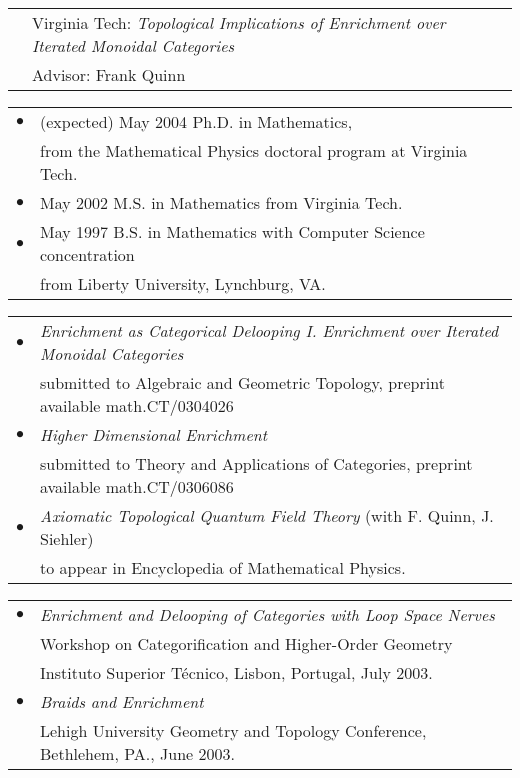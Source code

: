\documentclass[10pt]{article}
\begin{document}

\begin{tabular}{ll}
&Virginia Tech: {\itshape Topological Implications of Enrichment over Iterated Monoidal Categories}\\
&Advisor: Frank Quinn
\end{tabular}
\newline


\begin{tabular}{ll}
$\bullet$&(expected) May 2004 Ph.D. in Mathematics,\\
&from the Mathematical Physics doctoral program at Virginia Tech.\\
$\bullet$&May 2002 M.S. in Mathematics from Virginia Tech.\\
$\bullet$&May 1997 B.S. in Mathematics with Computer Science concentration\\
&from Liberty University, Lynchburg, VA.
\end{tabular}
\newline


\begin{tabular}{ll}
$\bullet$& {\itshape Enrichment as Categorical Delooping I. Enrichment over Iterated Monoidal Categories}\\
& submitted to Algebraic and Geometric Topology, preprint available math.CT/0304026\\
$\bullet$& {\itshape Higher Dimensional Enrichment}\\
&submitted to Theory and Applications of Categories, preprint available math.CT/0306086\\
$\bullet$& {\itshape Axiomatic Topological Quantum Field Theory} (with F. Quinn, J. Siehler)\\
&to appear in Encyclopedia of Mathematical Physics.\\
\end{tabular}
\newline


\begin{tabular}{ll}
$\bullet$&{\itshape Enrichment and Delooping of Categories with Loop Space Nerves}\\
&Workshop
on Categorification and Higher-Order Geometry\\
&Instituto Superior T\'{e}cnico, Lisbon, Portugal, July 2003.\\
$\bullet$&{\itshape Braids and Enrichment }\\
&Lehigh University Geometry and Topology Conference,
Bethlehem, PA., June 2003.\\

\end{tabular}
\newline
\end{document}
